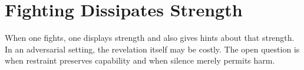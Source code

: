 \chapter{Fighting Dissipates Strength}
\label{chap:fighting-dissipates-strength}


When one fights, one displays strength and also gives hints about that
strength. In an adversarial setting, the revelation itself may be costly. The
open question is when restraint preserves capability and when silence merely
permits harm.
